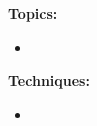 \documentclass[12pt]{article}
\author{Nutan Nepal}
\begin{document}
\textbf{Topics:}
\vspace*{2mm}
\begin{itemize}
    \item 
\end{itemize}

\newpage
\textbf{Techniques:}
\vspace*{2mm}
\begin{itemize}
    \item
\end{itemize}
\end{document}
